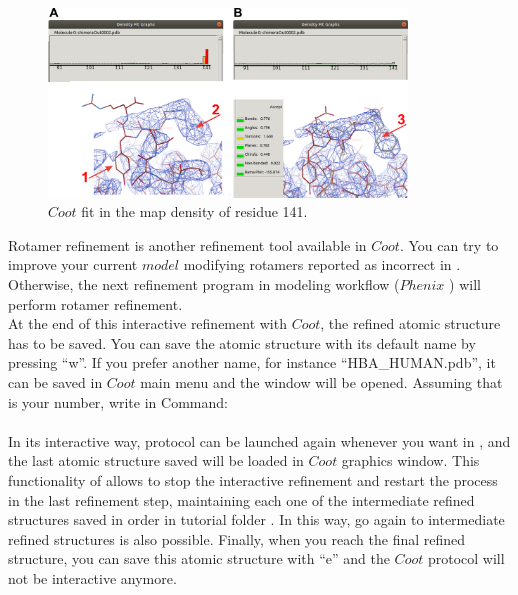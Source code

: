 \begin{itemize}
  \begin{figure}[H]
  \centering 
  \captionsetup{width=.7\linewidth} 
  \includegraphics[width=0.85\textwidth]{Images/Fig28.png}
  \caption{$Coot$ fit in the map density of residue  141.}
  \label{fig:coot_density_fit_analysis2}
  \end{figure}
  
 Rotamer refinement is another refinement tool available in $Coot$. You can try to improve your current $model$ modifying rotamers reported as incorrect in . Otherwise, the next refinement program in modeling workflow ($Phenix$ ) will perform rotamer refinement.\\
 
 At the end of this interactive refinement with $Coot$, the refined atomic structure has to be saved. You can save the atomic structure with its default name by pressing ``w''. If you prefer another name, for instance ``HBA\_HUMAN.pdb'', it can be saved in $Coot$ main menu  and the  window will be opened. Assuming that  is your  number, write in Command:\\
 \\
 
 In its interactive way,  protocol can be launched again whenever you want in \scipion, and the last atomic structure saved will be loaded in $Coot$ graphics window. This functionality of \scipion allows to stop the interactive refinement and restart the process in the last refinement step, maintaining each one of the intermediate refined structures saved in order in \scipion tutorial folder . In this way, go again to intermediate refined structures is also possible. Finally, when you reach the final refined structure, you can save this atomic structure with ``e'' and the $Coot$ protocol will not be interactive anymore.\\
 

\end{itemize}
